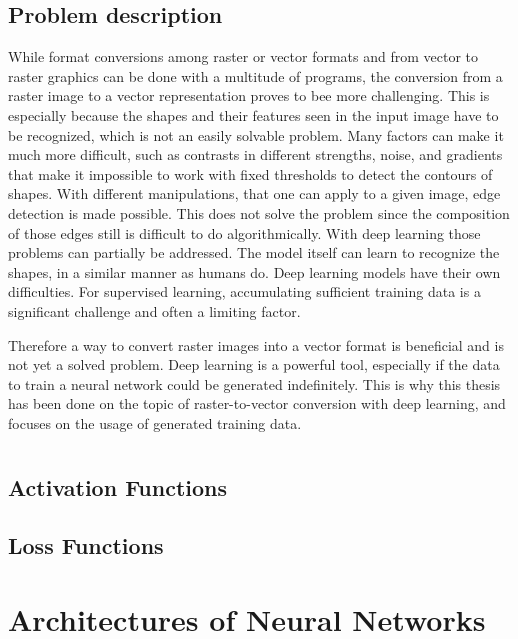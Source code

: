 \documentclass[12pt, a4paper, titlepage]{report}
\begin{document}
\subsection{Problem description}

While format conversions among raster or vector formats and from vector to raster graphics can be done with a multitude of programs, the conversion from a raster image to a vector representation proves to bee more challenging. This is especially because the shapes and their features seen in the input image have to be recognized, which is not an easily solvable problem. Many factors can make it much more difficult, such as contrasts in different strengths, noise, and gradients that make it impossible to work with fixed thresholds to detect the contours of shapes. With different manipulations, that one can apply to a given image, edge detection is made possible. This does not solve the problem since the composition of those edges still is difficult to do algorithmically.
With deep learning those problems can partially be addressed. The model itself can learn to recognize the shapes, in a similar manner as humans do. Deep learning models have their own difficulties. For supervised learning, accumulating sufficient training data is a significant challenge and often a limiting factor.

Therefore a way to convert raster images into a vector format is beneficial and is not yet a solved problem. Deep learning is a powerful tool, especially if the data to train a neural network could be generated indefinitely.
This is why this thesis has been done on the topic of raster-to-vector conversion with deep learning, and focuses on the usage of generated training data.


\pagebreak

\section{}
\subsection{Activation Functions}
\subsection{Loss Functions}

\section{Architectures of Neural Networks}
\end{document}
